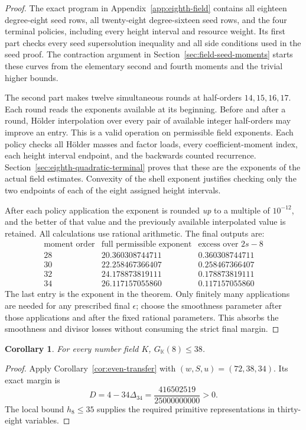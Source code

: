 \documentclass[11pt]{amsart}
\newtheorem{corollary}[theorem]{Corollary}
\theoremstyle{definition}
\numberwithin{equation}{section}
\begin{document}
\begin{proof}
The exact program in Appendix~\ref{app:eighth-field} contains all eighteen
degree-eight seed rows, all twenty-eight degree-sixteen seed rows, and
the four terminal policies, including every height interval and resource
weight. Its first part checks every seed supersolution inequality and
all side conditions used in the seed proof. The contraction argument in
Section~\ref{sec:field-seed-moments} starts these curves from the elementary
second and fourth moments and the trivial higher bounds.

The second part makes twelve simultaneous rounds at half-orders
$14,15,16,17$. Each round reads the exponents available at its beginning.
Before and after a round, H\"older interpolation over every pair of
available integer half-orders may improve an entry. This is a valid
operation on permissible field exponents. Each policy checks all
H\"older masses and factor loads, every coefficient-moment index, each
height interval endpoint, and the backwards counted recurrence.
Section~\ref{sec:eighth-quadratic-terminal} proves that these are the
exponents of the actual field estimates. Convexity of the shell exponent
justifies checking only the two endpoints of each of the eight assigned
height intervals.

After each policy application the exponent is rounded \emph{up} to a
multiple of $10^{-12}$, and the better of that value and the previously
available interpolated value is retained. All calculations use rational
arithmetic. The final outputs are:
\[
\begin{array}{c|c|c}
 \text{moment order}&\text{full permissible exponent}&\text{excess over }2s-8\\\hline
 28&20.360308744711&0.360308744711\\
 30&22.258467366407&0.258467366407\\
 32&24.178873819111&0.178873819111\\
 34&26.117157055860&0.117157055860
\end{array}
\]
The last entry is the exponent in the theorem. Only finitely many
applications are needed for any prescribed final $\epsilon$; choose
the smoothness parameter after those applications and after the fixed
rational parameters. This absorbs the smoothness and divisor losses
without consuming the strict final margin.
\end{proof}


\begin{corollary}\label{thm:eighth-transfer}
For every number field $K$, $G_{\mathbb K}(8)\le38$.
\end{corollary}
\begin{proof}
Apply Corollary~\ref{cor:even-transfer} with $(w,S,u)=(72,38,34)$.
Its exact margin is
\[
 D=4-34\Delta_{34}=\frac{416502519}{25000000000}>0.
\]
The local bound $h_8\le35$ supplies the required primitive
representations in thirty-eight variables.
\end{proof}
\end{document}
